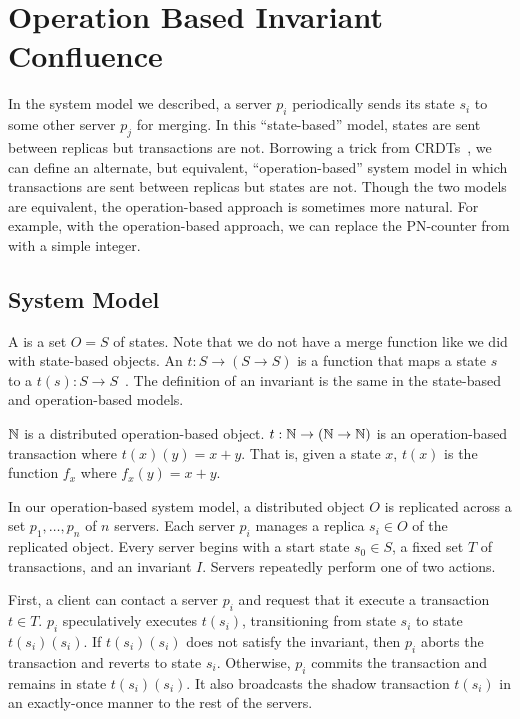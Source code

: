 \section{Operation Based Invariant Confluence}
In the system model we described, a server $p_i$ periodically sends its state
$s_i$ to some other server $p_j$ for merging. In this ``state-based'' model,
states are sent between replicas but transactions are not. Borrowing a trick
from CRDTs~\cite{shapiro2011conflict, shapiro2011comprehensive}, we can define
an alternate, but equivalent, ``operation-based'' system model in which
transactions are sent between replicas but states are not. Though the two
models are equivalent, the operation-based approach is sometimes more natural.
For example, with the operation-based approach, we can replace the PN-counter
from  with a simple integer.

\subsection{System Model}
A  is a set $O = S$ of states. Note
that we do not have a merge function like we did with state-based objects.
%
An  $t: S \to (S \to S)$ is a function
that maps a state $s$ to a  $t(s): S \to
S$~\cite{li2014automating}.
%
The definition of an invariant is the same in the state-based and
operation-based models.

\begin{example}
  $\mathbb{N}$ is a distributed operation-based object. $t: \mathbb{N} \to (\mathbb{N} \to
  \mathbb{N})$ is an operation-based transaction where $t(x)(y) = x + y$. That is,
  given a state $x$, $t(x)$ is the function $f_x$ where $f_x(y) = x + y$.
\end{example}

In our operation-based system model, a distributed object $O$ is replicated
across a set $p_1, \ldots, p_n$ of $n$ servers. Each server $p_i$ manages a
replica $s_i \in O$ of the replicated object. Every server begins with a start
state $s_0 \in S$, a fixed set $T$ of transactions, and an invariant $I$.
Servers repeatedly perform one of two actions.

First, a client can contact a server $p_i$ and request that it execute a
transaction $t \in T$. $p_i$ speculatively executes $t(s_i)$, transitioning
from state $s_i$ to state $t(s_i)(s_i)$. If $t(s_i)(s_i)$ does not satisfy the
invariant, then $p_i$ aborts the transaction and reverts to state $s_i$.
Otherwise, $p_i$ commits the transaction and remains in state $t(s_i)(s_i)$. It
also broadcasts the shadow transaction $t(s_i)$ in an exactly-once manner to
the rest of the servers.

